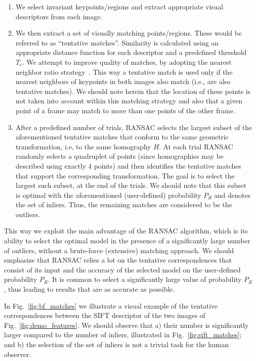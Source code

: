 \begin{enumerate}
    \item We select invariant keypoints/regions and extract appropriate
    visual descriptors from each image.
    \item We then extract a set of visually matching points/regions. These would be referred to as ``tentative matches''. Similarity is calculated using an appropriate distance function for each descriptor and a predefined threshold $T_c$. We attempt to improve quality of matches, by adopting the nearest neighbor ratio strategy~\cite{hartley2003multiple}. This way a tentative match is used only if the nearest neighbors of keypoints in both images also match (i.e., are also tentative matches). We should note herein that the location of these points is not taken into account within this matching strategy
    and also that a given point of a frame may match to more than one points of the other frame.
    \item After a predefined number of trials, RANSAC selects the largest subset of the aforementioned tentative matches that conform to the same geometric transformation, i.e, to the same homography $H$. At each trial RANSAC randomly selects a quadruplet of points (since homographies may be described using exactly 4 points) and then identifies the tentative matches that support the corresponding transformation. The goal is to select the largest such subset, at the end of the trials. We should note that this subset is optimal with the aforementioned (user-defined) probability $P_R$ and denotes the set of inliers. Thus, the remaining matches are considered to be the outliers. 
\end{enumerate}

This way we exploit the main advantage of the RANSAC algorithm, which is its ability to select the optimal model in the presence of a significantly large number of outliers, without a brute-force (extensive) matching approach. We should emphasize that RANSAC relies a lot on the tentative correspondences that consist of its input and the accuracy of the selected model on the user-defined probability $P_R$. It is common to select a significantly large value of probability $P_R$ , thus leading to results that are as accurate as possible.

In Fig.~\ref{fig:bf_matches} we illustrate a visual example of the tentative correspondences between the SIFT descriptor of the two images of Fig.~\ref{fig:demo_features}. We should observe that a) their number is significantly larger compared to the number of inliers, illustrated in Fig.~\ref{fig:sift_matches}; and b) the selection of the set of inliers is not a trivial task for the human observer. %

